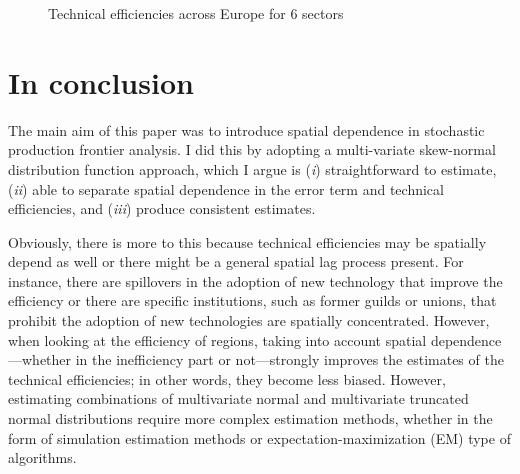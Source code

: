 \documentclass[11pt,parskip,abstracton,notitlepage]{scrartcl}
\begin{document}
\begin{figure}[ht!]
\caption{Technical efficiencies across Europe for 6 sectors}
\label{fig:sectoralsfe}
\end{figure}
%
\section{In conclusion}
%
The main aim of this paper was to introduce spatial dependence in stochastic production frontier analysis. I did this by adopting a multi-variate skew-normal distribution function approach, which I argue is (\emph{i}) straightforward to estimate, (\emph{ii}) able to separate spatial dependence in the error term and technical efficiencies, and (\emph{iii}) produce consistent estimates. 

Obviously, there is more to this because technical efficiencies may be spatially
depend as well or there might be a general spatial lag process present. For
instance, there are spillovers in the adoption of new technology that improve
the efficiency or there are specific institutions, such as former guilds or
unions, that prohibit the adoption of new technologies are spatially
concentrated. However, when looking at the efficiency of regions, taking into
account spatial dependence---whether in the inefficiency part or not---strongly
improves the estimates of the technical efficiencies; in other words, they
become less biased. However, estimating combinations of multivariate normal and
multivariate truncated normal distributions require more complex estimation
methods, whether in the form of simulation estimation methods or expectation-maximization (EM) type of algorithms.
\end{document}
